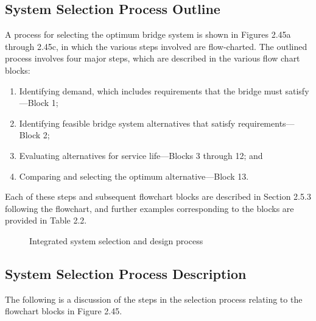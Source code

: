 \subsection{System Selection Process Outline}

A process for selecting the optimum bridge system is shown in Figures 2.45a through 2.45c, in which the various
steps involved are flow-charted. The outlined process involves four major steps, which are described in the various
flow chart blocks:

\begin{enumerate}
  \item Identifying demand, which includes requirements that the bridge must satisfy—Block 1;
  \item Identifying feasible bridge system alternatives that satisfy requirements—Block 2;
  \item Evaluating alternatives for service life—Blocks 3 through 12; and
  \item Comparing and selecting the optimum alternative—Block 13.
\end{enumerate}

Each of these steps and subsequent flowchart blocks are described in Section 2.5.3 following the flowchart, and further examples corresponding to the blocks are provided in Table 2.2.

\begin{figure}
  \caption{Integrated system selection and design process}
  \label{fig:integrated-system-selection-design-process}
\end{figure}

\subsection{System Selection Process Description}

The following is a discussion of the steps in the selection process relating to the flowchart blocks in Figure 2.45.

